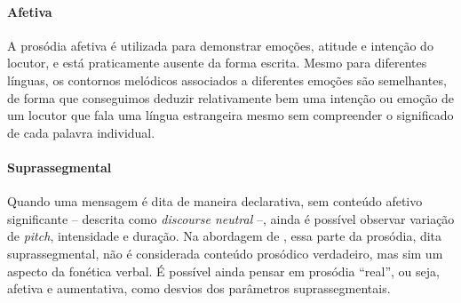 \paragraph{Afetiva} A prosódia afetiva é utilizada para demonstrar emoções,
atitude e intenção do locutor, e está praticamente ausente da forma escrita.
Mesmo para diferentes línguas, os contornos melódicos associados a diferentes
emoções são semelhantes, de forma que conseguimos deduzir relativamente bem uma
intenção ou emoção de um locutor que fala uma língua estrangeira mesmo sem
compreender o significado de cada palavra individual.

\paragraph{Suprassegmental} Quando uma mensagem é dita de maneira declarativa,
sem conteúdo afetivo significante -- descrita como \emph{discourse neutral} --,
ainda é possível observar variação de \emph{pitch}, intensidade e duração. Na
abordagem de , essa parte da prosódia, dita
suprassegmental, não é considerada conteúdo prosódico verdadeiro, mas sim um
aspecto da fonética verbal. É possível ainda pensar em prosódia ``real'', ou
seja, afetiva e aumentativa, como desvios dos parâmetros suprassegmentais.

